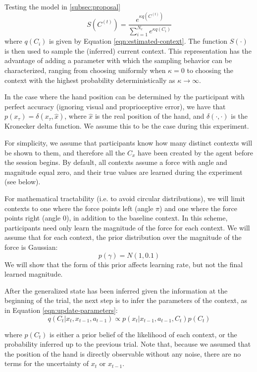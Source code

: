 \documentclass{report}
\def \eref #1{Equation \ref{#1}}   %
\begin{document}
\begin{chapter}{Testing the model in \ref{subsec:proposal}}
\begin{equation}
S(C^{(t)}) = \frac{e^{\kappa q\left(C^{(t)}\right)}}{\displaystyle \sum_{i=1}^{N_c}e^{\kappa q\left(C_i\right)}}
\end{equation}
where $q(C_i)$ is given by \eref{eqn:estimated-context}. The function $S(\cdot)$ is then used to sample the (inferred) current context. This representation has the advantage of adding a parameter with which the sampling behavior can be characterized, ranging from choosing uniformly when $\kappa = 0$ to choosing the context with the highest probability deterministically as $\kappa \rightarrow \infty$.

In the case where the hand position can be determined by the participant with perfect accuracy (ignoring visual and proprioceptive error), we have that $p(x_\tau) = \delta(x_\tau, \hat x)$, where $\hat x$ is the real position of the hand, and $\delta (\cdot, \cdot)$ is the Kronecker delta function. We assume this to be the case during this experiment.

For simplicity, we assume that participants know how many distinct contexts will be shown to them, and therefore all the $C_x$ have been created by the agent before the session begins. By default, all contexts assume a force with angle and magnitude equal zero, and their true values are learned during the experiment (see below).

For mathematical tractability (i.e. to avoid circular distributions), we will limit contexts to one where the force points left (angle $\pi$) and one where the force points right (angle 0), in addition to the baseline context. In this scheme, participants need only learn the magnitude of the force for each context. We will assume that for each context, the prior distribution over the magnitude of the force is Gaussian:
\[
p(\gamma) = N(1, 0.1)
\]
We will show that the form of this prior affects learning rate, but not the final learned magnitude.

After the generalized state has been inferred given the information at the beginning of the trial, the next step is to infer the parameters of the context, as in \eref{eqn:update-parameters}:
\begin{equation}
q(C_t | x_t, x_{t-1}, a_{t-1}) \propto p(x_t | x_{t-1}, a_{t-1}, C_t)p(C_t) \label{eqn:context-from-x}
\end{equation}

where $p(C_t)$ is either a prior belief of the likelihood of each context, or the probability inferred up to the previous trial. Note that, because we assumed that the position of the hand is directly observable without any noise, there are no terms for the uncertainty of $x_t$ or $x_{t-1}$.


\end{chapter}
\end{document}
